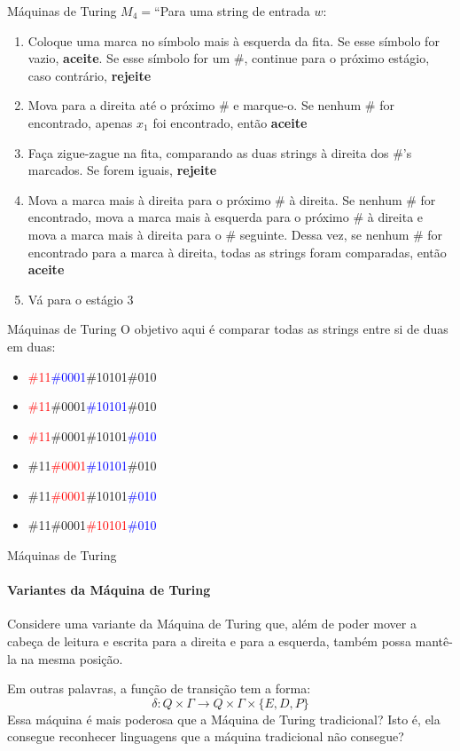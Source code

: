 \documentclass{beamer}
\begin{document}
\begin{frame}{Máquinas de Turing}
	$M_{4} = $``Para uma string de entrada $w$:
	\begin{enumerate}
		\item Coloque uma marca no símbolo mais à esquerda da fita. Se esse símbolo for vazio, \textbf{aceite}. Se esse símbolo for um \#, continue para o próximo estágio, caso contrário, \textbf{rejeite}
		\item Mova para a direita até o próximo \# e marque-o. Se nenhum \# for encontrado, apenas $x_{1}$ foi encontrado, então \textbf{aceite}
		\item Faça zigue-zague na fita, comparando as duas strings à direita dos \#'s marcados. Se forem iguais, \textbf{rejeite}
		\item Mova a marca mais à direita para o próximo \# à direita. Se nenhum \# for encontrado, mova a marca mais à esquerda para o próximo \# à direita e mova a marca mais à direita para o \# seguinte. Dessa vez, se nenhum \# for encontrado para a marca à direita, todas as strings foram comparadas, então \textbf{aceite}
		\item Vá para o estágio 3
	\end{enumerate}
\end{frame}
\begin{frame}{Máquinas de Turing}
	O objetivo aqui é comparar todas as strings entre si de duas em duas:
	\begin{itemize}
		\item \textcolor{red}{\#11}\textcolor{blue}{\#0001}\#10101\#010
		\item \textcolor{red}{\#11}\#0001\textcolor{blue}{\#10101}\#010
		\item \textcolor{red}{\#11}\#0001\#10101\textcolor{blue}{\#010}
		\item \#11\textcolor{red}{\#0001}\textcolor{blue}{\#10101}\#010
		\item \#11\textcolor{red}{\#0001}\#10101\textcolor{blue}{\#010}
		\item \#11\#0001\textcolor{red}{\#10101}\textcolor{blue}{\#010}
	\end{itemize}
\end{frame}
\begin{frame}{Máquinas de Turing}
	\framesubtitle{Variantes da Máquina de Turing}
	Considere uma variante da Máquina de Turing que, além de poder mover a cabeça de leitura e escrita para a direita e para a esquerda, também possa mantê-la na mesma posição.
	
	Em outras palavras, a função de transição tem a forma:
	\begin{equation*}
		\delta: Q \times \Gamma \rightarrow Q \times \Gamma \times \{E,D,P\}
	\end{equation*}
	Essa máquina é mais poderosa que a Máquina de Turing tradicional? Isto é, ela consegue reconhecer linguagens que a máquina tradicional não consegue?
\end{frame}
\end{document}
